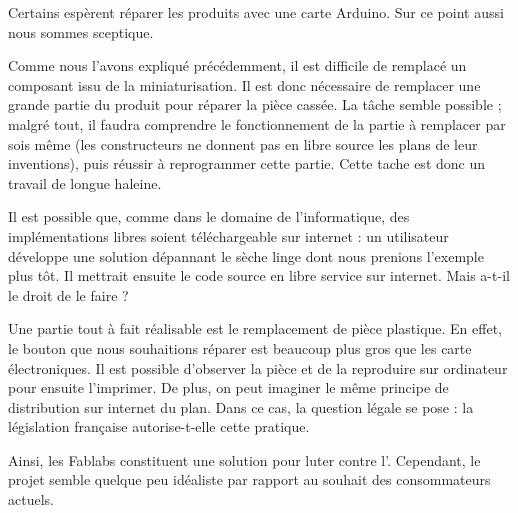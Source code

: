 \medbreak
Certains espèrent réparer les produits avec une carte Arduino. Sur ce point aussi nous sommes sceptique. 

Comme nous l'avons expliqué précédemment, il est difficile de remplacé un composant issu de la miniaturisation. Il est donc nécessaire de remplacer une grande partie du produit pour réparer la pièce cassée. La tâche semble possible ; malgré tout, il faudra comprendre le fonctionnement de la partie à remplacer par sois même (les constructeurs ne donnent pas en libre source les plans de leur inventions), puis réussir à reprogrammer cette partie. Cette tache est donc un travail de longue haleine. 

Il est possible que, comme dans le domaine de l'informatique, des implémentations libres soient téléchargeable sur internet : un utilisateur développe une solution dépannant le sèche linge dont nous prenions l'exemple plus tôt. Il mettrait ensuite le code source en libre service sur internet. Mais a-t-il le droit de le faire ? 

\medbreak 

Une partie tout à fait réalisable est le remplacement de pièce plastique. En effet, le bouton que nous souhaitions réparer est beaucoup plus gros que les carte électroniques. Il est possible d'observer la pièce et de la reproduire sur ordinateur pour ensuite l'imprimer. De plus, on peut imaginer le même principe de distribution sur internet du plan. Dans ce cas, la question légale se pose : la législation française autorise-t-elle cette pratique. 

\bigbreak

Ainsi, les Fablabs constituent une solution pour luter contre l'\op. Cependant, le projet semble quelque peu idéaliste par rapport au souhait des consommateurs actuels. 
\hugebreak
